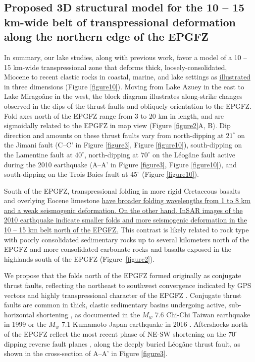 \documentclass[linenumbers,draft]{agujournal}
\begin{document}
\subsection{Proposed 3D structural model for the 10 -- 15 km-wide belt of transpressional deformation along the northern edge of the EPGFZ}
In summary, our lake studies, along with previous work, favor a model of a 10 -- 15 km-wide transpressional zone that deforms thick, loosely-consolidated, Miocene to recent clastic rocks in coastal, marine, and lake settings as \ul{illustrated} in three dimensions (Figure \ref{figure10}). Moving from Lake Azuey in the east to Lake Mirago\^ane in the west, the block diagram illustrates along-strike changes observed in the dips of the thrust faults and obliquely orientation to the EPGFZ. Fold axes north of the EPGFZ range from 3 to 20 km in length, and are sigmoidally related to the EPGFZ in map view (Figure \ref{figure2}A, B). Dip direction and amounts on these thrust faults vary from north-dipping at $21^{\circ}$ on the Jimani fault (C--C' in Figure \ref{figure3}, Figure \ref{figure10}), south-dipping on the Lamentine fault \citep{saint2015seismotectonics} at $40^{\circ}$, north-dipping at $70^{\circ}$ on the L\'eog\^ane fault active during the 2010 earthquake (A--A' in Figure \ref{figure3}, Figure \ref{figure10}), and south-dipping on the Trois Baies fault at $45^{\circ}$ (Figure \ref{figure10}). 

South of the EPGFZ, transpressional folding in more rigid Cretaceous basalts and overlying Eocene limestone \ul{have broader folding wavelengths from 1 to 8 km and a weak seismogenic deformation. On the other hand, InSAR images of the 2010 earthquake indicate smaller folds and more seismogenic deformation in the 10 -- 15 km belt north of the EPGFZ.} This contrast is likely related to rock type with poorly consolidated sedimentary rocks up to several kilometers north of the EPGFZ and more consolidated carbonate rocks and basalts exposed in the highlands south of the EPGFZ (Figure~\ref{figure2}).

We propose that the folds north of the EPGFZ formed originally as conjugate thrust faults, reflecting the northeast to southwest convergence indicated by GPS vectors and highly transpressional character of the EPGFZ \citep{calais2010transpressional}. Conjugate thrust faults are common in thick, clastic sedimentary basins undergoing active, sub-horizontal shortening \citep{sibson2012reverse}, as documented in the $M_w$ 7.6 Chi-Chi Taiwan earthquake in 1999 \citep{chen2002conjugate} or the $M_w$ 7.1 Kumamoto Japan earthquake in 2016 \citep{lin2017coseismic}. Aftershocks north of the EPGFZ reflect the most recent phase of NE-SW shortening on the $70^{\circ}$ dipping reverse fault planes \citep{nettles2010earthquake}, along the deeply buried L\'eog\^ane thrust fault, as shown in the cross-section of A--A' in Figure \ref{figure3}.
\end{document}
